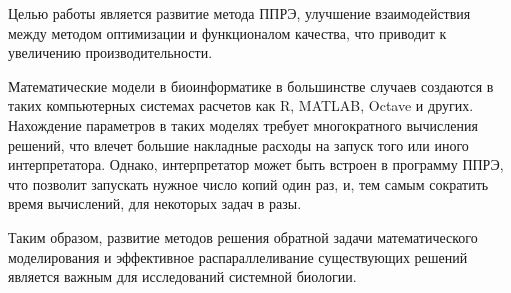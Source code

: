 Целью работы является развитие метода ППРЭ,
улучшение взаимодействия между
методом оптимизации и функционалом качества,
что приводит к увеличению производительности.

Математические модели в биоинформатике
в большинстве случаев создаются
в таких компьютерных системах расчетов
как R, MATLAB, Octave и других.
Нахождение параметров в таких моделях
требует многократного вычисления решений,
что влечет большие накладные расходы на запуск
того или иного интерпретатора.
Однако, интерпретатор может быть встроен в программу ППРЭ,
что позволит запускать нужное число копий один раз,
и, тем самым сократить время вычислений, для некоторых задач в разы.

Таким образом,
развитие методов решения обратной задачи математического моделирования
и эффективное распараллеливание существующих решений
является важным для исследований системной биологии.

